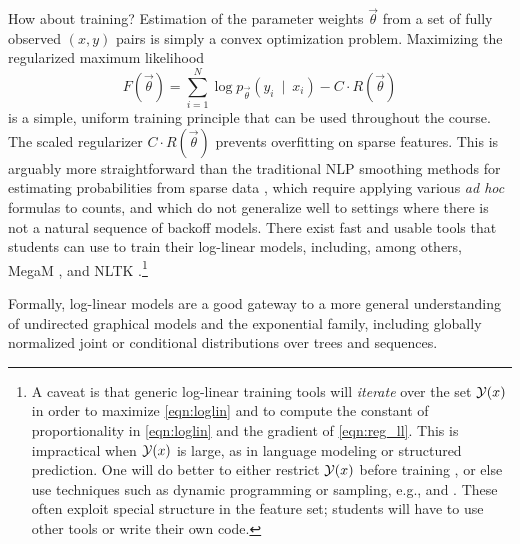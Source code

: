 \documentclass[11pt,letterpaper]{article}
\DeclareMathOperator*{\argmax}{arg\,max}
\begin{document}
How about training?  Estimation of the parameter weights
$\vec{\theta}$ from a set of fully observed $(x,y)$ pairs is simply a
convex optimization problem.  Maximizing the regularized maximum
likelihood
\begin{equation}\label{eqn:reg_ll}
  F\left(\vec{\theta}\right) = \sum_{i=1}^N \log{p_{\vec{\theta}}\left(y_i\ \mid\ x_i\right)} - C \cdot R\left(\vec{\theta}\right)
\end{equation}
is a simple, uniform training principle that can be used throughout
the course.  The scaled regularizer $C\cdot R(\vec{\theta})$
prevents overfitting on sparse features.
This is arguably more straightforward than the traditional NLP
smoothing methods for estimating probabilities from sparse data
\cite{chen-goodman-1996}, which require applying various {\em ad hoc}
formulas to counts, and which do not generalize well to settings where
there is not a natural sequence of backoff models.  There exist 
fast and usable tools that students can use to train their log-linear
models, including, among others, MegaM \cite{daume04cg-bfgs}, 
and NLTK \cite{bird2009natural}.\footnote{\label{fn:bigY}A caveat is that generic
  log-linear training tools will {\em iterate} over the set ${\cal
    Y}(x)$ in order to maximize
  \eqref{eqn:loglin} and to compute the constant of proportionality
  in \eqref{eqn:loglin} and the gradient of
  \eqref{eqn:reg_ll}.  This is impractical when ${\cal Y}(x)$ is large, as in
  language modeling or structured prediction.  One will do better to
 either restrict ${\cal Y}(x)$ before training
\cite{johnson-et-al-1999}, or else use techniques such as dynamic
programming or sampling, e.g., 
\cite{lafferty-mccallum-pereira-2001} and \cite{rosenfeld-chen-zhu-2001}. 
These often exploit special
structure in the feature set; students will have to use other tools or 
write their own code.}

Formally, log-linear models are a good gateway to a more general
understanding of undirected graphical models and the exponential
family, including globally normalized joint or conditional
distributions over trees and sequences.
\end{document}
